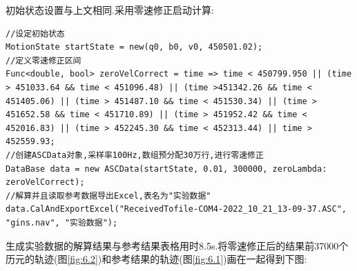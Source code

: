 \documentclass[10pt,a4paper]{ctexart}
\begin{document}
初始状态设置与上文相同.采用零速修正启动计算:
\begin{lstlisting}
//设定初始状态
MotionState startState = new(q0, b0, v0, 450501.02);
//定义零速修正区间
Func<double, bool> zeroVelCorrect = time => time < 450799.950 || (time > 451033.64 && time < 451096.48) || (time >451342.26 && time < 451405.06) || (time > 451487.10 && time < 451530.34) || (time > 451652.58 && time < 451710.89) || (time > 451952.42 && time < 452016.83) || (time > 452245.30 && time < 452313.44) || time > 452559.93;
//创建ASCData对象,采样率100Hz,数组预分配30万行,进行零速修正
DataBase data = new ASCData(startState, 0.01, 300000, zeroLambda: zeroVelCorrect);
//解算并且读取参考数据导出Excel,表名为"实验数据"
data.CalAndExportExcel("ReceivedTofile-COM4-2022_10_21_13-09-37.ASC", "gins.nav", "实验数据");
\end{lstlisting}
生成实验数据的解算结果与参考结果表格用时8.5s.将零速修正后的结果前37000个历元的轨迹(图\ref{fig:6.2})和参考结果的轨迹(图\ref{fig:6.1})画在一起得到下图:
\end{document}
